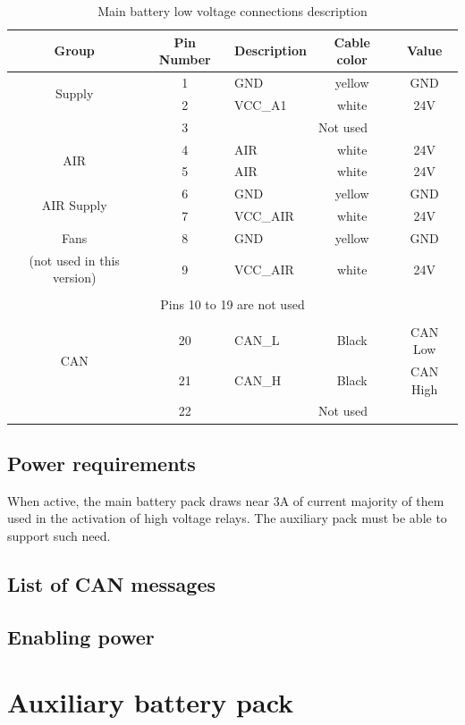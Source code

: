 \begin{table}
	\centering
	\begin{tabular}{cclcc}
		\toprule
		\textbf{Group} & \textbf{Pin Number} & \textbf{Description} & \textbf{Cable color} & \textbf{Value}\\
		\midrule
		\multirow{2}{*}{Supply}& 1 & GND     & yellow & GND	\\
		 & 2 & VCC\_A1 & white  & 24V \\
		 \midrule
		 & 3 & \multicolumn{3}{c}{Not used} \\
		 \midrule
		 \multirow{2}{*}{AIR} & 4 & AIR     & white  & 24V \\	
		 & 5 & AIR     & white  & 24V \\
		 \midrule
		 \multirow{2}{*}{AIR Supply}& 6 & GND	    & yellow & GND \\
		 & 7 & VCC\_AIR  & white  & 24V \\
		 \midrule
		 Fans & 8 & GND	    & yellow & GND \\
		 (not used in this version) & 9 & VCC\_AIR  & white  & 24V \\
		 \midrule
		 \vspace{1pt}\\
		 \multicolumn{5}{c}{Pins 10 to 19 are not used}\\
		 \vspace{1pt}\\
		 \midrule
		 \multirow{2}{*}{CAN}& 20 & CAN\_L & Black & CAN Low \\
		 & 21 & CAN\_H  & Black  & CAN High \\
		 \midrule
		  & 22 & \multicolumn{3}{c}{Not used} \\
		\bottomrule
	\end{tabular}
	\caption{Main battery low voltage connections description}
	\label{tab:lv_connections}
\end{table}

\subsection{Power requirements}
When active, the main battery pack draws near 3A of current majority of them used in the activation of high voltage relays. The auxiliary pack must be able to support such need.

\subsection{List of CAN messages}
\blindtext

\subsection{Enabling power}
\blindtext

\section{Auxiliary battery pack}
\blindtext

